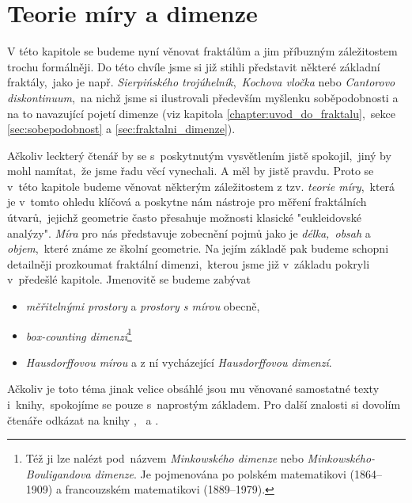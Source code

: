 \chapter{Teorie míry a dimenze}\label{chapter:teorie-miry-a-dimenze}

V této kapitole se budeme nyní věnovat fraktálům a jim příbuzným záležitostem trochu formálněji. Do této chvíle jsme si již stihli představit některé základní fraktály,~jako je např. \emph{Sierpińského trojúhelník},~\emph{Kochova vločka} nebo \emph{Cantorovo diskontinuum},~na nichž jsme si ilustrovali především myšlenku soběpodobnosti a na to navazující pojetí dimenze (viz kapitola \ref{chapter:uvod_do_fraktalu},~sekce \ref{sec:sobepodobnost} a \ref{sec:fraktalni_dimenze}).

Ačkoliv leckterý čtenář by se s~poskytnutým vysvětlením jistě spokojil,~jiný by mohl namítat,~že jsme řadu věcí vynechali. A měl by jistě pravdu. Proto se v~této kapitole budeme věnovat některým záležitostem z tzv. \emph{teorie míry},~která je v~tomto ohledu klíčová a poskytne nám nástroje pro měření fraktálních útvarů,~jejichž geometrie často přesahuje možnosti klasické "eukleidovské analýzy". \emph{Míra} pro nás představuje zobecnění pojmů jako je \emph{délka,~obsah} a \emph{objem},~které známe ze školní geometrie. Na jejím základě pak budeme schopni detailněji prozkoumat fraktální dimenzi,~kterou jsme již v~základu pokryli v~předešlé kapitole. Jmenovitě se budeme zabývat
\begin{itemize}
    \item \emph{měřitelnými prostory} a \emph{prostory s mírou} obecně,
    \item \emph{box-counting dimenzí}\footnote{Též ji lze nalézt pod~názvem \emph{Minkowského dimenze} nebo \emph{Minkowského-Bouligandova dimenze}. Je pojmenována po polském matematikovi  (1864--1909) a francouzském matematikovi  (1889--1979).}
    \item \emph{Hausdorffovou mírou} a z ní vycházející \emph{Hausdorffovou dimenzí}.
\end{itemize}

Ačkoliv je toto téma jinak velice obsáhlé jsou mu věnované samostatné texty i~knihy,~spokojíme se pouze s~naprostým základem. Pro další znalosti si dovolím čtenáře odkázat na knihy \cite{Falconer2014},~\cite{Lukes2013} a \cite{Netuka2016}.





